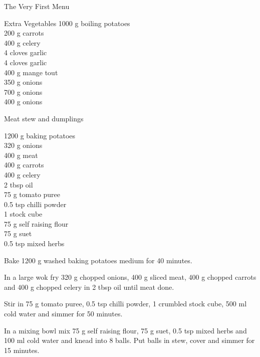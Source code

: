 \begin{menu}{The Very First Menu}
\begin{shoppinglist}{Extra Vegetables}
      1000 g boiling potatoes \\ 
      200 g carrots \\ 
      400 g celery \\ 
      4 cloves garlic \\ 
      4 cloves garlic \\ 
      400 g mange tout \\ 
      350 g onions \\ 
      700 g onions \\ 
      400 g onions \\ 
      \end{shoppinglist}%
      \par\vfil %
    \vfil\clearpage
  
    \begin{recipe}{2}{Meat stew and dumplings}%
    
	
	
		\begin{ingredients}
		1200 g baking potatoes  \\
	320 g onions  \\
	400 g meat  \\
	400 g carrots  \\
	400 g celery  \\
	2 tbsp oil  \\
	75 g tomato puree  \\
	0.5 tsp chilli powder  \\
	1  stock cube  \\
	75 g self raising flour  \\
	75 g suet  \\
	0.5 tsp mixed herbs  \\
	
		\end{ingredients}
	
    \begin{instructions}
    \item 
      Bake 1200 g washed baking potatoes 
      medium for 40 minutes.
    \item 
        In a large wok fry
        320 g chopped onions,
        400 g sliced meat,
        400 g chopped carrots
        and
        400 g chopped celery
        in
        2 tbsp  oil
        until meat done.
      \item 
        Stir in
        75 g  tomato puree,
        0.5 tsp  chilli powder,
        1  crumbled stock cube,
        500 ml  cold water
        and simmer for 50 minutes.
      \item 
        In a mixing bowl mix
        75 g  self raising flour,
        75 g  suet,
        0.5 tsp  mixed herbs
        and
        100 ml  cold water
        and knead into 8 balls.
        Put balls in stew, cover and
        simmer for 15 minutes.
      

\end{instructions}
\end{recipe}
\end{menu}
